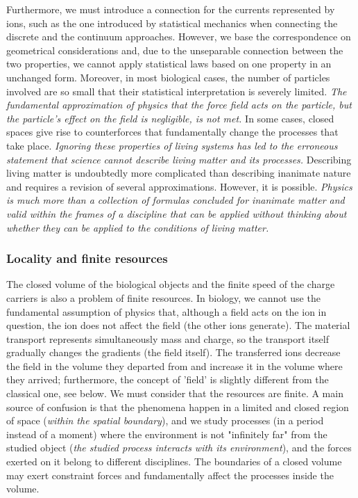 Furthermore, we must introduce a connection for the currents represented by ions, such as the one introduced by statistical mechanics when connecting the discrete and the continuum approaches.
However, we base the correspondence on geometrical considerations and, due to the unseparable connection between the two properties, we cannot apply statistical laws based on one property in an unchanged form.
Moreover, in most biological cases, the number of particles involved are so small that their statistical interpretation is severely limited.
\textit{The fundamental approximation of physics that the force field acts on the particle, but the particle's effect on the field is negligible, is not met.}
In some cases, closed spaces give rise to counterforces that fundamentally change the processes that take place.
\textit{Ignoring these properties of living systems has led to the erroneous statement that science cannot describe living matter and its processes.}
Describing living matter is undoubtedly more complicated than describing inanimate nature and requires a revision of several approximations. However, it is possible.
\textit{Physics is much more than a collection of formulas concluded
for inanimate matter and valid within the frames of a discipline
that
can be applied without thinking about whether they can be applied 
to the conditions of living matter.}



\subsubsection{Locality and finite resources\label{sec:Physics-Resources}}


The closed volume of the biological objects and the finite speed of the charge carriers is also
a problem of finite resources. In biology, we cannot use the
fundamental assumption of physics that, although a field acts on the 
ion in question, the ion does not affect the field (the other ions generate).
The material transport represents simultaneously mass and charge,
so the transport itself gradually changes the gradients (the field itself). 
The transferred ions decrease the field in the volume they departed from
and increase it in the volume where they arrived; furthermore, the concept of 'field' is slightly different from the classical one, see
below.
We must consider that the resources are finite. A main source of confusion is that the phenomena happen in a limited and closed region of space (\textit{within the spatial boundary}), and we study processes (in a period instead of a moment) where the environment is not "infinitely far" from the studied object (\textit{the studied process interacts with its environment}), and
the forces exerted on it belong to different disciplines.
The boundaries of a closed volume
may exert constraint forces and fundamentally affect the processes inside the volume.


